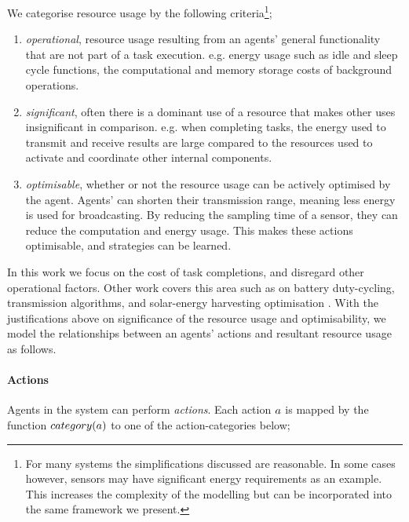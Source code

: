 We categorise resource usage by the following criteria\footnote{For many systems the simplifications discussed are reasonable. In some cases however, sensors may have significant energy requirements as an example. This increases the complexity of the modelling but can be incorporated into the same framework we present.};
\begin{enumerate}
	\item \textit{operational}, resource usage resulting from an agents' general functionality that are not part of a task execution. e.g. energy usage such as idle and sleep cycle functions, the computational and memory storage costs of background operations. 
	
	\item \textit{significant}, often there is a dominant use of a resource that makes other uses insignificant in comparison. e.g. when completing tasks, the energy used to transmit and receive results are large compared to the resources used to activate and coordinate other internal components. 
	
	\item \textit{optimisable}, whether or not the resource usage can be actively optimised by the agent. Agents' can shorten their transmission range, meaning less energy is used for broadcasting. By reducing the sampling time of a sensor, they can reduce the computation and energy usage. This makes these actions optimisable, and strategies can be learned.
\end{enumerate} 

In this work we focus on the cost of task completions, and disregard other operational factors. Other work covers this area such as on battery duty-cycling, transmission algorithms, and solar-energy harvesting optimisation \citep{Kumar2010,Pinto2012,Matin2012,Escolar2014, Sharma2018}. With the justifications above on significance of the resource usage and optimisability, we model the relationships between an agents' actions and resultant resource usage as follows. 

\paragraph{Actions}
Agents in the system can perform \textit{actions}. Each action $\varAction{}{}$ is mapped by the function $\functionAgentActionType{}{}$ to one of the action-categories below;

